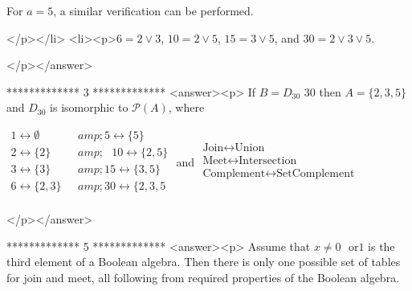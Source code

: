 For \(a=5\), a similar verification can be performed.

</p></li>
<li><p>\(6 = 2 \lor  3\), \(10 = 2 \lor  5\), \(15 = 3 \lor  5\), and \(30 = 2 \lor  3 \lor  5\).

</p></answer>


*************
3
*************
<answer><p> If \(B = D_{30}\text{}\) 30 then \(A = \{2, 3, 5\}\) and \(D_{30}\) is isomorphic to \(\mathcal{P}(A)\), where



\(\begin{array}{cc}
 1\leftrightarrow \emptyset \text{    } &amp; 5\leftrightarrow  \{5\} \\
 2\leftrightarrow  \{2\}\text{    } &amp; \text{  }10\leftrightarrow  \{2,5\} \\
 3\leftrightarrow  \{3\}\text{    } &amp; 15\leftrightarrow  \{3,5\} \\
 6\leftrightarrow  \{2,3\}\text{  } &amp; 30\leftrightarrow  \{2,3,5 \\
\end{array}\)   and   \(\begin{array}{c}
 \text{Join} \leftrightarrow  \text{Union} \\
 \text{Meet}\leftrightarrow  \text{Intersection} \\
 \text{Complement}\leftrightarrow  \text{Set} \text{Complement}  \\
\end{array}\)

</p></answer>


*************
5
*************
<answer><p> Assume that \(x \neq  0\text{  }\text{or} 1\) is the third element of a Boolean algebra. Then there is only one possible set of tables for join
and meet, all following from required properties of the Boolean algebra.



